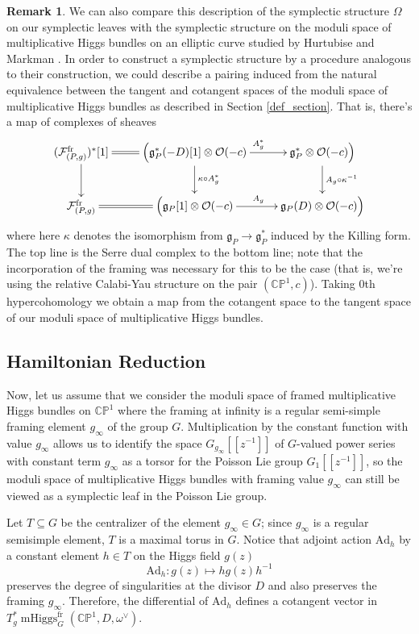 \documentclass[11pt, oneside, reqno]{amsart}
\theoremstyle{definition} \newtheorem{definition}{Definition}[section]
\theoremstyle{definition} \newtheorem{remark}[definition]{Remark}
\theoremstyle{definition} \newtheorem{remarks}[definition]{Remarks}
\theoremstyle{definition} \newtheorem{question}[definition]{Question}
\theoremstyle{definition} \newtheorem*{note}{Note}
\theoremstyle{definition} \newtheorem{example}[definition]{Example}
\theoremstyle{definition} \newtheorem{examples}[definition]{Examples}
\renewcommand{\gg}{\mathfrak{g}}
\newcommand{\bb}[1]{\mathbb{#1}}
\newcommand{\mr}[1]{\mathrm{#1}}
\newcommand{\mc}[1]{\mathcal{#1}}
\newcommand{\OO}{\mathcal{O}}
\newcommand{\sub}{\subseteq}
\DeclareMathOperator{\mhiggs}{mHiggs}
\newcommand{\fr}{\mathrm{fr}}
\newcommand{\Ad}{\mr{Ad}}
\begin{document}
\begin{remark}
We can also compare this description of the symplectic structure $\Omega$ on our symplectic leaves with the symplectic structure on the moduli space of multiplicative Higgs bundles on an elliptic curve studied by Hurtubise and Markman \cite{HurtubiseMarkman}.  In order to construct a symplectic structure by a procedure analogous to their construction, we could describe a pairing induced from the natural equivalence between the tangent and cotangent spaces of the moduli space of multiplicative Higgs bundles as described in Section \ref{def_section}.  That is, there's a map of complexes of sheaves
\[\xymatrix{
(\mc F^\fr_{(P,g)})^*[1] \ar@{=}[r] \ar[d] &\Big(\gg^*_P(-D)[1] \otimes \OO(-c) \ar[d]^{\kappa \circ A_g^*} \ar[r]^{A_g^*} &\gg^*_P \otimes \OO(-c)\Big)\ar[d]^{A_g \circ \kappa^{-1}} \\
\mc F^\fr_{(P,g)} \ar@{=}[r] &\Big(\gg_P[1] \otimes \OO(-c) \ar[r]^{A_g} &\gg_P(D) \otimes \OO(-c)\Big)
}\]
where here $\kappa$ denotes the isomorphism from $\gg_P \to \gg^*_P$ induced by the Killing form.  The top line is the Serre dual complex to the bottom line; note that the incorporation of the framing was necessary for this to be the case (that is, we're using the relative Calabi-Yau structure on the pair $(\bb{CP}^1, c)$).  Taking 0th hypercohomology we obtain a map from the cotangent space to the tangent space of our moduli space of multiplicative Higgs bundles.
\end{remark}

\subsection{Hamiltonian Reduction} \label{Reduced_section}

Now, let us assume that we consider the moduli space of framed multiplicative Higgs bundles on $\bb{CP}^1$ where the framing at infinity is a regular semi-simple framing element $g_{\infty}$ of the group $G$.  Multiplication by the constant function with value $g_\infty$ allows us to identify the space $G_{g_\infty}[[z^{-1}]]$ of $G$-valued power series with constant term $g_\infty$ as a torsor for the Poisson Lie group $G_1[[z^{-1}]]$, so the moduli space of multiplicative Higgs bundles with framing value $g_\infty$ can still be viewed as a symplectic leaf in the Poisson Lie group.

Let $T \sub G$ be the centralizer of the element $g_\infty \in G$; since $g_\infty$ is a regular semisimple element, $T$ is a maximal torus in $G$. Notice that adjoint action $\Ad_{h}$ by a constant element $h \in T$ on the Higgs field $g(z)$
\[
\Ad_{h} \colon  g(z) \mapsto h g(z) h^{-1} 
\]
preserves the degree of singularities at the divisor $D$ and also preserves the framing $g_\infty$. Therefore, the differential of $\Ad_{h}$ defines a cotangent vector in $T^*_{g} \mhiggs^\fr_G(\bb{CP}^1, D, \omega^\vee)$. 
\end{document}
